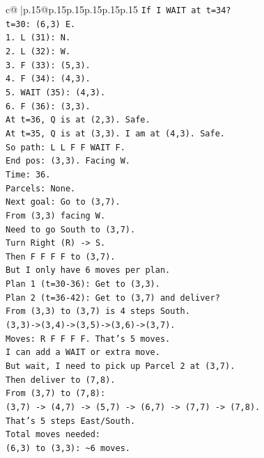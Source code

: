 \documentclass{article}
\begin{document}
{\begin{supertabular}{c@{$\;$}|p{.15\linewidth}@{}p{.15\linewidth}p{.15\linewidth}p{.15\linewidth}p{.15\linewidth}p{.15\linewidth}}
{{{\texttt{If I WAIT at t=34?} \\
\texttt{t=30: (6,3) E.} \\
\texttt{1. L (31): N.} \\
\texttt{2. L (32): W.} \\
\texttt{3. F (33): (5,3).} \\
\texttt{4. F (34): (4,3).} \\
\texttt{5. WAIT (35): (4,3).} \\
\texttt{6. F (36): (3,3).} \\
\texttt{At t=36, Q is at (2,3). Safe.} \\
\texttt{At t=35, Q is at (3,3). I am at (4,3). Safe.} \\
\texttt{So path: L L F F WAIT F.} \\
\texttt{End pos: (3,3). Facing W.} \\
\texttt{Time: 36.} \\
\texttt{Parcels: None.} \\
\texttt{Next goal: Go to (3,7).} \\
\texttt{From (3,3) facing W.} \\
\texttt{Need to go South to (3,7).} \\
\texttt{Turn Right (R) {-}> S.} \\
\texttt{Then F F F F to (3,7).} \\
\texttt{But I only have 6 moves per plan.} \\
\texttt{Plan 1 (t=30{-}36): Get to (3,3).} \\
\texttt{Plan 2 (t=36{-}42): Get to (3,7) and deliver?} \\
\texttt{From (3,3) to (3,7) is 4 steps South.} \\
\texttt{(3,3){-}>(3,4){-}>(3,5){-}>(3,6){-}>(3,7).} \\
\texttt{Moves: R F F F F. That's 5 moves.} \\
\texttt{I can add a WAIT or extra move.} \\
\texttt{But wait, I need to pick up Parcel 2 at (3,7).} \\
\texttt{Then deliver to (7,8).} \\
\texttt{From (3,7) to (7,8):} \\
\texttt{(3,7) {-}> (4,7) {-}> (5,7) {-}> (6,7) {-}> (7,7) {-}> (7,8).} \\
\texttt{That's 5 steps East/South.} \\
\texttt{Total moves needed:} \\
\texttt{(6,3) to (3,3): \textasciitilde{}6 moves.} \\
}}}
\end{supertabular}}
\end{document}
